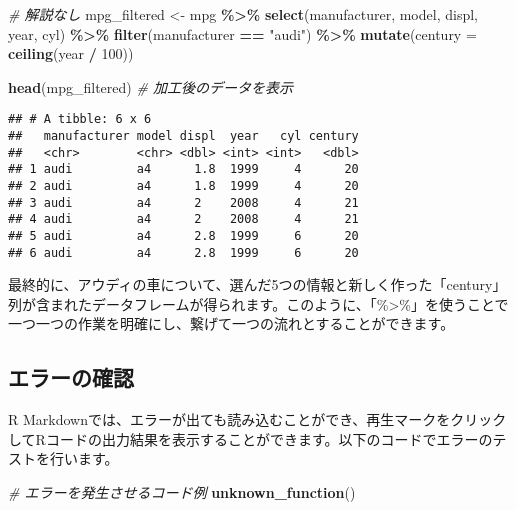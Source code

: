 \documentclass[
]{article}
\newenvironment{Shaded}{\begin{snugshade}}{\end{snugshade}}
\newcommand{\AttributeTok}[1]{\textcolor[rgb]{0.13,0.29,0.53}{#1}}
\newcommand{\CommentTok}[1]{\textcolor[rgb]{0.56,0.35,0.01}{\textit{#1}}}
\newcommand{\DecValTok}[1]{\textcolor[rgb]{0.00,0.00,0.81}{#1}}
\newcommand{\FunctionTok}[1]{\textcolor[rgb]{0.13,0.29,0.53}{\textbf{#1}}}
\newcommand{\NormalTok}[1]{#1}
\newcommand{\OtherTok}[1]{\textcolor[rgb]{0.56,0.35,0.01}{#1}}
\newcommand{\SpecialCharTok}[1]{\textcolor[rgb]{0.81,0.36,0.00}{\textbf{#1}}}
\newcommand{\StringTok}[1]{\textcolor[rgb]{0.31,0.60,0.02}{#1}}
\begin{document}
\begin{Shaded}
\begin{Highlighting}[]
\CommentTok{\# 解説なし}
\NormalTok{mpg\_filtered }\OtherTok{\textless{}{-}}\NormalTok{ mpg }\SpecialCharTok{\%\textgreater{}\%}  
  \FunctionTok{select}\NormalTok{(manufacturer, model, displ, year, cyl) }\SpecialCharTok{\%\textgreater{}\%}  
  \FunctionTok{filter}\NormalTok{(manufacturer }\SpecialCharTok{==} \StringTok{"audi"}\NormalTok{) }\SpecialCharTok{\%\textgreater{}\%}  
  \FunctionTok{mutate}\NormalTok{(}\AttributeTok{century =} \FunctionTok{ceiling}\NormalTok{(year }\SpecialCharTok{/} \DecValTok{100}\NormalTok{)) }
\end{Highlighting}
\end{Shaded}

\begin{Shaded}
\begin{Highlighting}[]
\FunctionTok{head}\NormalTok{(mpg\_filtered)  }\CommentTok{\# 加工後のデータを表示}
\end{Highlighting}
\end{Shaded}

\begin{verbatim}
## # A tibble: 6 x 6
##   manufacturer model displ  year   cyl century
##   <chr>        <chr> <dbl> <int> <int>   <dbl>
## 1 audi         a4      1.8  1999     4      20
## 2 audi         a4      1.8  1999     4      20
## 3 audi         a4      2    2008     4      21
## 4 audi         a4      2    2008     4      21
## 5 audi         a4      2.8  1999     6      20
## 6 audi         a4      2.8  1999     6      20
\end{verbatim}

最終的に、アウディの車について、選んだ5つの情報と新しく作った「century」列が含まれたデータフレームが得られます。このように、「\%\textgreater\%」を使うことで一つ一つの作業を明確にし、繋げて一つの流れとすることができます。

\hypertarget{ux30a8ux30e9ux30fcux306eux78baux8a8d}{%
\subsection{エラーの確認}\label{ux30a8ux30e9ux30fcux306eux78baux8a8d}}

R
Markdownでは、エラーが出ても読み込むことができ、再生マークをクリックしてRコードの出力結果を表示することができます。以下のコードでエラーのテストを行います。

\begin{Shaded}
\begin{Highlighting}[]
\CommentTok{\# エラーを発生させるコード例}
\FunctionTok{unknown\_function}\NormalTok{()}
\end{Highlighting}
\end{Shaded}
\end{document}
